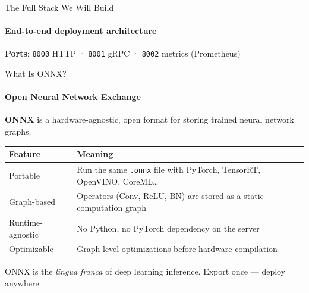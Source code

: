 \documentclass[aspectratio=169]{beamer}
\begin{document}
\begin{frame}[t]{The Full Stack We Will Build}
\framesubtitle{End-to-end deployment architecture}
\vspace{-0.3cm}
\begin{center}
\end{center}
\vspace{1mm}
\footnotesize
\textbf{Ports}: \texttt{8000} HTTP · \texttt{8001} gRPC · \texttt{8002} metrics (Prometheus)
\end{frame}

\begin{frame}[t]{What Is ONNX?}
\framesubtitle{Open Neural Network Exchange}
\vspace*{-0.4cm}
\textbf{ONNX} is a hardware-agnostic, open format for storing trained neural network graphs.
\vspace{2mm}
\begin{tabular}{@{}p{3.2cm}p{8.0cm}@{}}
\toprule
Feature & Meaning \\
\midrule
Portable & Run the same \texttt{.onnx} file with PyTorch, TensorRT, OpenVINO, CoreML\ldots \\
Graph-based & Operators (Conv, ReLU, BN) are stored as a static computation graph \\
Runtime-agnostic & No Python, no PyTorch dependency on the server \\
Optimizable & Graph-level optimizations before hardware compilation \\
\bottomrule
\end{tabular}

{ONNX is the \textit{lingua franca} of deep learning inference.
Export once --- deploy anywhere.}
\end{frame}
\end{document}
